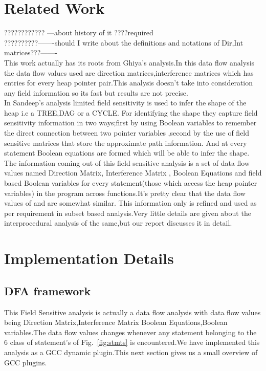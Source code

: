 \documentclass[11pt]{article}
\begin{document}
\section{Related Work}

???????????? ---about history of it ????required\\
??????????-------should I write about the definitions and notations of Dir,Int matrices???-------\\

This work actually has its roots from Ghiya's \cite{Ghiya96} analysis.In this data flow analysis the data flow
values used are direction matrices,interference matrices which has entries for every heap pointer
pair.This analysis doesn't take into consideration any field information so its fast but results are
not precise. \\
    In Sandeep's \cite{Sandeep} analysis limited field sensitivity is used to infer the shape of the heap i.e a
TREE,DAG or a CYCLE. For identifying the shape they capture field sensitivity information in
two ways;first by using Boolean variables to remember the direct connection between two pointer
variables ,second by the use of field sensitive matrices that store the approximate path information.
And at every statement Boolean equations are formed which will be able to infer the shape.
The information coming out of this field sensitive analysis is a set of data flow values named Direction Matrix,
Interference Matrix , Boolean Equations and field based Boolean variables for every
statement(those which access the heap pointer variables) in the program across functions.It's pretty clear
that the data flow values of \cite{Ghiya96} and \cite{Sandeep} are somewhat similar. This
information only is refined and used as per requirement in  subset based analysis.Very little details are given
about the interprocedural analysis of the same,but our report discusses it in detail.


\section{Implementation Details}

\subsection{DFA framework}
      
    This Field Sensitive analysis is actually a data flow analysis with data flow values being Direction Matrix,Interference Matrix
Boolean Equations,Boolean variables.The data flow values changes whenever any statement belonging to
the 6 class of statement's of Fig.~\ref{fig:stmts} is encountered.We have implemented this analysis
as a GCC dynamic plugin.This next section gives us a small overview of GCC plugins.\\
 
\end{document}

